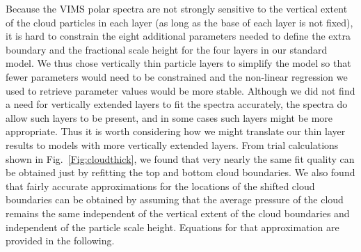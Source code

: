 \documentclass[article,11pt]{emulateapj}
\begin{document}
Because the VIMS polar spectra are not strongly sensitive to the vertical
extent of the cloud particles in each layer (as long as the base of
each layer is not fixed), it is hard to constrain the eight additional
parameters needed to define the extra boundary and the fractional scale height
for the four layers in our standard model. We thus chose vertically thin
particle layers to simplify the model so that fewer parameters would
need to be constrained and the non-linear regression we used to
retrieve parameter values would be more
stable.  Although we did not find a need for vertically extended layers to
fit the spectra accurately, the spectra do allow such layers to be present, and
in some cases such layers might be more appropriate.  Thus it is worth
considering how we might translate our thin layer results to models with
more vertically extended layers.  From trial calculations shown in
Fig.\ \ref{Fig:cloudthick}, we found that very nearly the same fit
quality can be obtained just by refitting the top and bottom cloud
boundaries.  We also found that fairly accurate approximations for
the locations of the shifted cloud boundaries can be obtained by 
assuming that the average pressure of the cloud remains the same
independent of the vertical extent of the cloud boundaries and
independent of the particle scale height. Equations for that approximation
are provided in the following.
\end{document}

